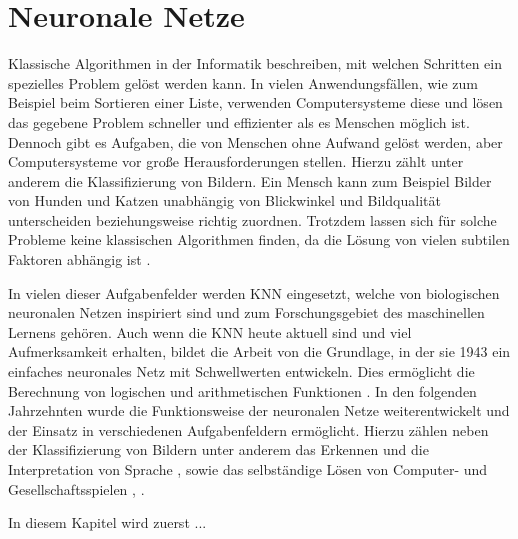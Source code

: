 \section{Neuronale Netze}
\label{sec:neuroal_networks}
Klassische Algorithmen in der Informatik beschreiben, mit welchen Schritten ein spezielles Problem gelöst werden kann. In vielen Anwendungsfällen, wie zum Beispiel beim Sortieren einer Liste, verwenden Computersysteme diese und lösen das gegebene Problem schneller und effizienter als es Menschen möglich ist. 
Dennoch gibt es Aufgaben, die von Menschen ohne Aufwand gelöst werden, aber Computersysteme vor große Herausforderungen stellen. Hierzu zählt unter anderem die Klassifizierung von Bildern. Ein Mensch kann zum Beispiel Bilder von Hunden und Katzen unabhängig von Blickwinkel und Bildqualität unterscheiden beziehungsweise richtig zuordnen. Trotzdem lassen sich für solche Probleme keine klassischen Algorithmen finden, da die Lösung von vielen subtilen Faktoren abhängig ist \cite{kriesel2008kleiner}.

In vielen dieser Aufgabenfelder werden \ac{KNN} eingesetzt, welche von biologischen neuronalen Netzen inspiriert sind und zum Forschungsgebiet des maschinellen Lernens gehören. Auch wenn die \ac{KNN} heute aktuell sind und viel Aufmerksamkeit erhalten, bildet die Arbeit von \citeauthor{mcculloch1943logical} die Grundlage, in der sie 1943 ein einfaches neuronales Netz mit Schwellwerten entwickeln. Dies ermöglicht die Berechnung von logischen und arithmetischen Funktionen \cite{mcculloch1943logical}. In den folgenden Jahrzehnten wurde die Funktionsweise der neuronalen Netze weiterentwickelt und der Einsatz in verschiedenen Aufgabenfeldern ermöglicht. Hierzu zählen neben der Klassifizierung von Bildern \cite{krizhevsky2012imagenet} unter anderem das Erkennen und die Interpretation von Sprache \cite{hinton2012deep}, \cite{andor2016globally} sowie das selbständige Lösen von Computer- und Gesellschaftsspielen \cite{mnih2013playing}, \cite{silver2016mastering}. 

In diesem Kapitel wird zuerst ...%
